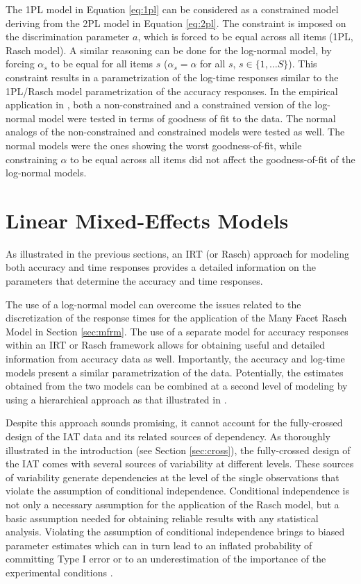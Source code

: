 \documentclass[12pt]{book}
\begin{document}
The 1PL model in Equation \ref{eq:1pl} can be considered as a constrained model deriving from the 2PL model in Equation \ref{eq:2pl}. 
The constraint is imposed on the discrimination parameter $a$, which is forced to be equal across all items (1PL, Rasch model). 
A similar reasoning can be done for the log-normal model, by forcing $\alpha_s$ to be equal for all items $s$ ($\alpha_s = \alpha$ for all $s$, $s \in \{1, \ldots S\}$).
This constraint results in a parametrization of the log-time responses similar to  the 1PL/Rasch model parametrization of the accuracy responses.
In the empirical application in , both a non-constrained and a constrained version of the log-normal model were tested in terms of goodness of fit to the data. 
The normal analogs of the non-constrained and constrained models were tested as well. 
The normal models were the ones showing the worst goodness-of-fit, while constraining $\alpha$ to be equal across all items did not affect the  goodness-of-fit of the log-normal models. 


\section{Linear Mixed-Effects Models}

As illustrated in the previous sections, an IRT (or Rasch) approach for modeling both accuracy and  time responses provides a detailed information on the parameters that determine the accuracy and time responses. 


The use of a log-normal model can overcome the issues related to the discretization of the response times for the application of the Many Facet Rasch Model in Section \ref{sec:mfrm}. 
The use of a separate model for accuracy responses within an IRT or Rasch framework allows for obtaining useful and detailed information from accuracy data as well. Importantly, the accuracy and log-time models present a similar parametrization of the data.  
Potentially, the estimates obtained from the two models can be combined at a second level of modeling by using a hierarchical approach as that illustrated in . 

Despite this approach sounds promising, it cannot account for the fully-crossed design of the IAT data and its related sources of dependency. As thoroughly illustrated in the introduction (see Section \ref{sec:cross}), the fully-crossed design of the IAT comes with several sources of variability at different levels. These sources of variability generate dependencies at the level of the single observations that violate the assumption of conditional independence. 
Conditional independence is not only a necessary assumption for the application of the Rasch model, but a basic assumption needed for obtaining reliable results with any statistical analysis.
Violating the assumption of conditional independence brings to biased parameter estimates which can in turn lead to an inflated probability of committing Type I error or to an underestimation of the importance of the experimental conditions \cite{Barr2013, judd2012,mc1989}. 
\end{document}
